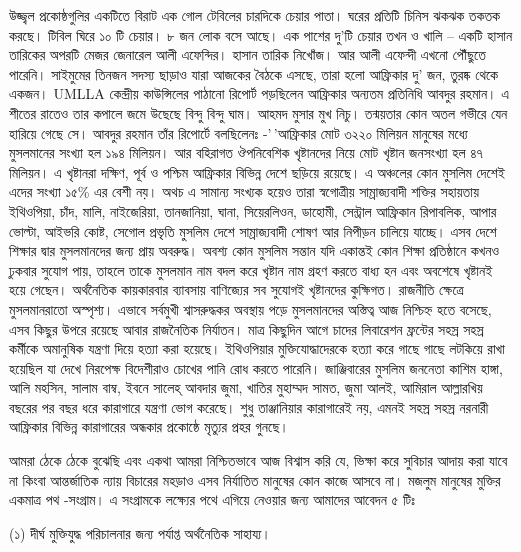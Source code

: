 \documentclass[
]{book}
\begin{document}
উজ্জ্বল প্রকোষ্ঠগুলির একটিতে বিরাট এক গোল টেবিলের চারদিকে চেয়ার পাতা। ঘরের প্রতিটি চিনিস ঝকঝক তকতক করছে। টিবিল ঘিরে ১০ টি চেয়ার। ৮ জন লোক বসে আছে। এক পাশের দু'টি চেয়ার তখন ও খালি -- একটি হাসান তারিকের অপরটি মেজর জেনারেল আলী এফেন্দির। হাসান তারিক নিখোঁজ। আর আলী এফেন্দী এখনো পৌঁছুতে পারেনি। সাইমুমের তিনজন সদস্য ছাড়াও যারা আজকের বৈঠকে এসছে, তারা হলো আফ্রিকার দু' জন, তুরষ্ক থেকে একজন। UMLLA কেন্দ্রীয় কাউন্সিলের পাঠানো রিপোর্ট পড়ছিলেন আফ্রিকার অন্যতম প্রতিনিধি আবদুর রহমান। এ শীতের রাতেও তার কপালে জমে উছেছে বিন্দু বিন্দু ঘাম। আহমদ মুসার মুখ নিচু। তন্ময়তার কোন অতল গভীরে যেন হারিয়ে গেছে সে। আবদুর রহমান তাঁর রিপোর্টে বলছিলেনঃ -'\,'আফ্রিকার মোট ৩২২০ মিলিয়ন মানুষের মধ্যে মুসলমানের সংখ্যা হল ১৯৪ মিলিয়ন। আর বহিরাগত ঔপনিবেশিক খৃষ্টানদের নিয়ে মোট খৃষ্টান জনসংখ্যা হল ৪৭ মিলিয়ন। এ খৃষ্টানরা দক্ষিণ, পূর্ব ও পশ্চিম আফ্রিকার বিভিন্ন দেশে ছড়িয়ে রয়েছে। এ অঞ্চলের কোন মুসলিম দেশেই এদের সংখ্যা ১৫\% এর বেশী নয়। অথচ এ সামান্য সংখ্যক হয়েও তারা স্বগোত্রীয় সাম্রাজ্যবাদী শক্তির সহায়তায় ইথিওপিয়া, চাঁদ, মালি, নাইজেরিয়া, তানজানিয়া, ঘানা, সিয়েরলিওন, ডাহোমী, সেন্ট্রাল আফ্রিকান রিপাবলিক, আপার ভোল্টা, আইভরি কোষ্ট, সেগোল প্রভৃতি মুসলিম দেশে সাম্রাজ্যবাদী শোষণ আর নিপীড়ন চালিয়ে যাচ্ছে। এসব দেশে শিক্ষার দ্বার মুসলমানদের জন্য প্রায় অবরুদ্ধ। অবশ্য কোন মুসলিম সন্তান যদি একান্তই কোন শিক্ষা প্রতিষ্ঠানে কখনও ঢুকবার সুযোগ পায়, তাহলে তাকে মুসলমান নাম বদল করে খৃষ্টান নাম গ্রহণ করতে বাধ্য হন এবং অবশেষে খৃষ্টানই হয়ে গেছেন। অর্থনৈতিক কায়কারবার ব্যাবসায় বাণিজ্যের সব সুযোগই খৃষ্টানদের কুক্ষিগত। রাজনীতি ক্ষেত্রে মুসলমানরাতো অস্পৃশ্য। এভাবে সর্বমুখী শ্বাসরুদ্ধকর অবস্থায় পড়ে মুসলমানদের অস্তিত্ব আজ নিশ্চিহ্ন হতে বসেছে, এসব কিছুর উপরে রয়েছে আবার রাজনৈতিক নির্যাতন। মাত্র কিছুদিন আগে চাদের লিবারেশন ফ্রন্টের সহস্র সহস্র কর্মীকে অমানুষিক যন্ত্রণা দিয়ে হত্যা করা হয়েছে। ইথিওপিয়ার মুক্তিযোদ্ধাদেরকে হত্যা করে গাছে গাছে লটকিয়ে রাখা হয়েছিল যা দেখে নিরপেক্ষ বিদেশীরাও চোখের পানি রোধ করতে পারেনি। জাঞ্জিবারের মুসলিম জননেতা কাশিম হাঙ্গা, আলি মহসিন, সালাম বাম্ব, ইবনে সালেহ্ আবদার জুমা, খাতির মুহাম্মদ সামত, জুমা আলই, আমিরাল আল্লারখিয় বছরের পর বছর ধরে কারাগারে যন্ত্রণা ভোগ করেছে। শুধু তাঞ্জানিয়ার কারাগারেই নয়, এমনই সহস্র সহস্র নরনারী আফ্রিকার বিভিন্ন কারাগারের অন্ধকার প্রকোষ্ঠে মৃত্যুর প্রহর গুনছে।

আমরা ঠেকে ঠেকে বুঝেছি এবং একথা আমরা নিশ্চিতভাবে আজ বিশ্বাস করি যে, ভিক্ষা করে সুবিচার আদায় করা যাবে না কিংবা আন্তর্জাতিক ন্যায় বিচারের মহড়াও এসব নির্যাতিত মানুষের কোন কাজে আসবে না। মজলুম মানুষের মুক্তির একমাত্র পথ -সংগ্রাম। এ সংগ্রামকে লক্ষ্যের পথে এগিয়ে নেওয়ার জন্য আমাদের আবেদন ৫ টিঃ

(১) দীর্ঘ মুক্তিযুদ্ধ পরিচালনার জন্য পর্যাপ্ত অর্থনৈতিক সাহায্য।
\end{document}
